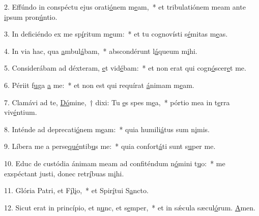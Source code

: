 2. Effúndo in conspéctu ejus orati\uline{ó}nem m\uline{e}am,~* et tribulatiónem meam ante \uline{i}psum pron\uline{ú}ntio.\par 
3. In deficiéndo ex me sp\uline{í}ritum m\uline{e}um:~* et tu cognovísti s\uline{é}mitas m\uline{e}as.\par 
4. In via hac, qua \uline{a}mbul\uline{á}bam,~* abscondérunt l\uline{á}queum m\uline{i}hi.\par 
5. Considerábam ad déxteram, \uline{e}t vid\uline{é}bam:~* et non erat qui cogn\uline{ó}scer\uline{e}t me.\par 
6. Périit f\uline{u}ga \uline{a} me:~* et non est qui requírat \uline{á}nimam m\uline{e}am.\par 
7. Clamávi ad te, \uline{Dó}mine,~† dixi: Tu \uline{e}s spes m\uline{e}a,~* pórtio mea in t\uline{e}rra viv\uline{é}ntium.\par 
8. Inténde ad deprecati\uline{ó}nem m\uline{e}am:~* quia humili\uline{á}tus sum n\uline{i}mis.\par 
9. Líbera me a perse\uline{qué}ntib\uline{u}s me:~* quia confort\uline{á}ti sunt s\uline{u}per me.\par 
10. Educ de custódia ánimam meam ad confiténdum n\uline{ó}mini t\uline{u}o:~* me exspéctant justi, donec retr\uline{í}buas m\uline{i}hi.\par 
11. Glória Patri, et F\uline{í}l\uline{i}o,~* et Spir\uline{í}tui S\uline{a}ncto.\par 
12. Sicut erat in princípio, et n\uline{u}nc, et s\uline{e}mper,~* et in sǽcula sæcul\uline{ó}rum. \uline{A}men.\par 

